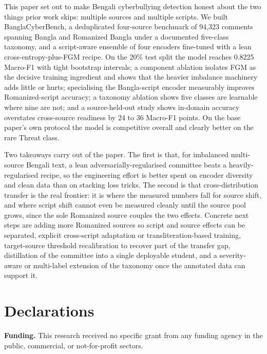 \documentclass[11pt,a4paper]{article}
\def\emph#1{#1}%
\newcommand{\bench}{BanglaCyberBench}
\begin{document}
This paper set out to make Bengali cyberbullying detection honest about the two things prior work skips: multiple sources and multiple scripts. We built \bench{}, a deduplicated four-source benchmark of 94{,}323 comments spanning Bangla and Romanized Bangla under a documented five-class taxonomy, and a script-aware ensemble of four encoders fine-tuned with a lean cross-entropy-plus-FGM recipe. On the 20\% test split the model reaches 0.8225 Macro-F1 with tight bootstrap intervals; a component ablation isolates FGM as the decisive training ingredient and shows that the heavier imbalance machinery adds little or hurts; specialising the Bangla-script encoder measurably improves Romanized-script accuracy; a taxonomy ablation shows five classes are learnable where nine are not; and a source-held-out study shows in-domain accuracy overstates cross-source readiness by 24 to 36 Macro-F1 points. On the base paper's own protocol the model is competitive overall and clearly better on the rare \emph{Threat} class.

Two takeaways carry out of the paper. The first is that, for imbalanced multi-source Bengali text, a lean adversarially-regularised committee beats a heavily-regularised recipe, so the engineering effort is better spent on encoder diversity and clean data than on stacking loss tricks. The second is that cross-distribution transfer is the real frontier: it is where the measured numbers fall for source shift, and where script shift cannot even be measured cleanly until the source pool grows, since the sole Romanized source couples the two effects. Concrete next steps are adding more Romanized sources so script and source effects can be separated, explicit cross-script adaptation or transliteration-based training, target-source threshold recalibration to recover part of the transfer gap, distillation of the committee into a single deployable student, and a severity-aware or multi-label extension of the taxonomy once the annotated data can support it.

\section*{Declarations}

\noindent\textbf{Funding.} This research received no specific grant from any funding agency in the public, commercial, or not-for-profit sectors.
\end{document}
